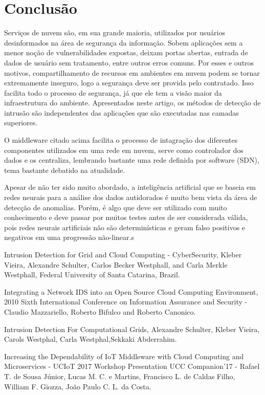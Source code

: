 \documentclass[journal]{IEEEtran}
\begin{document}
\section{Conclusão}
Serviços de nuvem são, em sua grande maioria, utilizados por usuários desinformados na área de segurança da informação. Sobem aplicações sem a menor noção de vulnerabilidades expostas, deixam portas abertas, entrada de dados de usuário sem tratamento, entre outros erros comuns. Por esses e outros motivos, compartilhamento de recursos em ambientes em nuvem podem se tornar extremamente inseguro, logo a segurança deve ser provida pelo contratado. Isso facilita todo o processo de segurança, já que ele tem a visão maior da infraestrutura do ambiente. Apresentados neste artigo, os métodos de detecção de intrusão são independentes das aplicações que são executadas nas camadas superiores. \par
O middleware citado acima facilita o processo de intagração dos diferentes componentes utilizados em uma rede em nuvem, serve como controlador dos dados e os centraliza, lembrando bastante uma rede definida por software (SDN), tema bastante debatido na atualidade. \par
Apesar de não ter sido muito abordado, a inteligência artificial que se baseia em redes neurais para a análise dos dados autidorados é muito bem vista da área de detecção de anomalias. Porém, é algo que deve ser utilizado com muito conhecimento e deve passar por muitos testes antes de ser considerada válida, pois redes neurais artificiais não são determinísticas e geram falso positivos e negativos em uma progressão não-linear.s

%


\begin{thebibliography}{1}

Intrusion Detection for Grid and Cloud Computing - CyberSecurity, Kleber Vieira, Alexandre Schulter, Carlos Becker Westphall, and Carla Merkle Westphall, Federal University of Santa Catarina, Brazil.

Integrating a Network IDS into an Open Source Cloud Computing Environment, 2010 Sixth International Conference on Information Assurance and Security - Claudio Mazzariello, Roberto Bifulco and Roberto Canonico.

Intrusion Detection For Computational Grids, Alexandre Schulter, Kleber Vieira, Carols Westphal, Carla Westphal,Sekkaki Abderrahim.

Increasing the Dependability of IoT Middleware with Cloud Computing and Microservices - UCIoT 2017 Workshop Presentation UCC Companion’17 - Rafael T. de Sousa Júnior, Lucas M. C. e Martins, Francisco L. de Caldas Filho, William F. Giozza, João Paulo C. L. da Costa.

\end{thebibliography}
\end{document}

